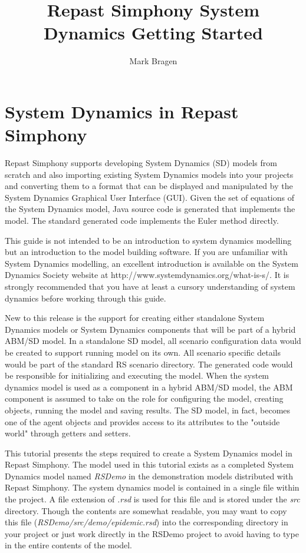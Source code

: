 \documentclass[11pt]{amsart}
\title{Repast Simphony System Dynamics Getting Started}
\author{Mark Bragen}
\begin{document}
 
\maketitle

\section{System Dynamics in Repast Simphony}
Repast Simphony supports developing System Dynamics (SD) models from scratch and also importing existing System Dynamics models into your projects and converting them to a format that can be displayed and manipulated by the System Dynamics Graphical User Interface (GUI). Given the set of equations of the System Dynamics model, Java source code is generated that implements the model. The standard generated code implements the Euler method directly.

This guide is not intended to be an introduction to system dynamics modelling but an introduction to the model building software. If you are unfamiliar with System Dynamics modelling, an excellent introduction is available on the System Dynamics Society website at http://www.systemdynamics.org/what-is-s/. It is strongly recommended that you have at least a cursory understanding of system dynamics before working through this guide.

New to this release is the support for creating either standalone System Dynamics models or System Dynamics components that will be part of a hybrid ABM/SD model. In a standalone SD model, all scenario configuration data would be created to support running model on its own. All scenario specific details would be part of the standard RS scenario directory. The generated code would be responsible for initializing and executing the model. When the system dynamics model is used as a component in a hybrid ABM/SD model, the ABM component is assumed to take on the role for configuring the model, creating objects, running the model and saving results. The SD model, in fact, becomes one of the agent objects and provides access to its attributes to the "outside world" through getters and setters.

This tutorial presents the steps required to create a System Dynamics model in Repast Simphony. The model used in this tutorial exists as a  completed System Dynamics model named \textit{RSDemo} in the demonstration models distributed with Repast Simphony. The system dynamics model is contained in a single file within the project. A file extension of \textit{.rsd} is used for this file and is stored under the \textit{src} directory. Though the contents are somewhat readable, you may want to copy this file (\textit{RSDemo/src/demo/epidemic.rsd}) into the corresponding directory in your project or just work directly in the RSDemo project to avoid having to type in the entire contents of the model.
\end{document}
